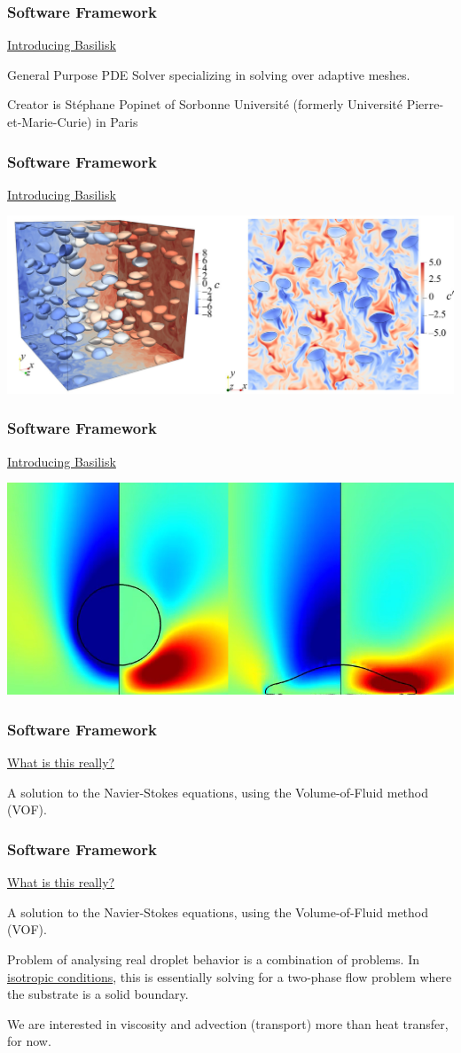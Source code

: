 \documentclass[12pt]{beamer}
\begin{document}
\begin{frame}
    \frametitle{Software Framework}
    \underline{Introducing Basilisk}

    General Purpose PDE Solver specializing in solving over adaptive meshes.

    Creator is Stéphane Popinet of Sorbonne Université (formerly Université Pierre-et-Marie-Curie) in Paris
\end{frame}
\begin{frame}
    \frametitle{Software Framework}
    \underline{Introducing Basilisk}

    \includegraphics[width=\textwidth]{img/3-hidman2023.jpg}
\end{frame}
\begin{frame}
    \frametitle{Software Framework}
    \underline{Introducing Basilisk}

    \includegraphics[width=\textwidth]{img/4-drop.png}
\end{frame}
\begin{frame}
    \frametitle{Software Framework}
    \underline{What is this really?}

    A solution to the Navier-Stokes equations,
    using the Volume-of-Fluid method (VOF).
\end{frame}
\begin{frame}
    \frametitle{Software Framework}
    \underline{What is this really?}

    A solution to the Navier-Stokes equations,
    using the Volume-of-Fluid method (VOF).

    Problem of analysing real droplet behavior is a combination of problems. In 
    \underline{isotropic conditions}, this is essentially solving for a 
    two-phase flow problem where the substrate is a solid boundary.

    We are interested in viscosity and advection (transport) more than 
    heat transfer, for now.
\end{frame}
\end{document}
